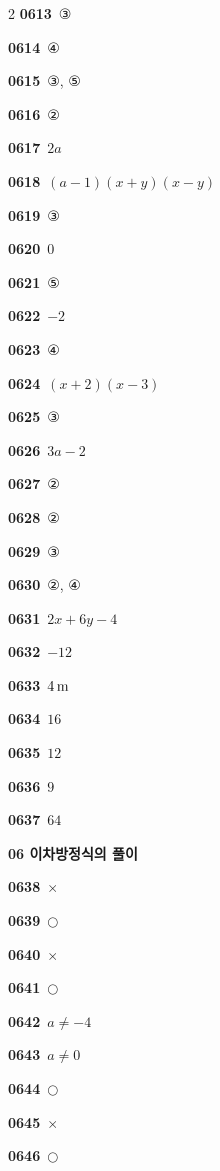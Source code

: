 \documentclass[10pt,a4paper]{article}
\begin{document}
\begin{multicols}{2}
\noindent\textbf{0613}\ ③\par
\noindent\textbf{0614}\ ④\par
\noindent\textbf{0615}\ ③, ⑤\par
\noindent\textbf{0616}\ ②\par
\noindent\textbf{0617}\ $2a$\par
\noindent\textbf{0618}\ $(a-1)(x+y)(x-y)$\par
\noindent\textbf{0619}\ ③\par
\noindent\textbf{0620}\ $0$\par
\noindent\textbf{0621}\ ⑤\par
\noindent\textbf{0622}\ $-2$\par
\noindent\textbf{0623}\ ④\par
\noindent\textbf{0624}\ $(x+2)(x-3)$\par
\noindent\textbf{0625}\ ③\par
\noindent\textbf{0626}\ $3a-2$\par
\noindent\textbf{0627}\ ②\par
\noindent\textbf{0628}\ ②\par
\noindent\textbf{0629}\ ③\par
\noindent\textbf{0630}\ ②, ④\par
\noindent\textbf{0631}\ $2x+6y-4$\par
\noindent\textbf{0632}\ $-12$\par
\noindent\textbf{0633}\ $4\mkern3mu \mathrm{m}$\par
\noindent\textbf{0634}\ $16$\par
\noindent\textbf{0635}\ $12$\par
\noindent\textbf{0636}\ $9$\par
\noindent\textbf{0637}\ $64$\par
\noindent\textbf{06 이차방정식의 풀이}\par\smallskip
\noindent\textbf{0638}\ $\times$\par
\noindent\textbf{0639}\ $\bigcirc$\par
\noindent\textbf{0640}\ $\times$\par
\noindent\textbf{0641}\ $\bigcirc$\par
\noindent\textbf{0642}\ $a\ne-4$\par
\noindent\textbf{0643}\ $a\ne0$\par
\noindent\textbf{0644}\ $\bigcirc$\par
\noindent\textbf{0645}\ $\times$\par
\noindent\textbf{0646}\ $\bigcirc$\par

\end{multicols}
\end{document}
